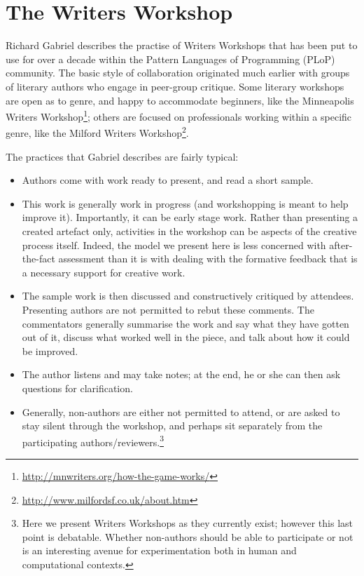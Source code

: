 \section{The Writers Workshop} \label{sec:writers-workshop}

Richard Gabriel \citeyear{gabriel2002writer} describes the practise of
Writers Workshops that has been put to use for over a decade within
the Pattern Languages of Programming (PLoP) community.  The basic
style of collaboration originated much earlier with groups of literary
authors who engage in peer-group critique.  Some literary workshops
are open as to genre, and happy to accommodate beginners, like the
Minneapolis Writers
Workshop\footnote{\url{http://mnwriters.org/how-the-game-works/}};
others are focused on professionals working within a specific genre,
like the Milford Writers
Workshop\footnote{\url{http://www.milfordsf.co.uk/about.htm}}.  

The
practices that Gabriel describes are fairly typical:  
\begin{itemize}
\item Authors come with work ready to present, and read a short
  sample.
\item This work is generally work in progress (and workshopping is
  meant to help improve it).  Importantly, it can be early stage work.
  Rather than presenting a created artefact only, activities in the
  workshop can be aspects of the creative process itself.  Indeed, the
  model we present here is less concerned with after-the-fact
  assessment than it is with dealing with the formative feedback that
  is a necessary support for creative work.
\item The sample work is then
discussed and constructively critiqued by attendees.  Presenting
authors are not permitted to rebut these comments.  The commentators
generally summarise the work and say what they have gotten out of it,
discuss what worked well in the piece, and talk about how it could be
improved.  
\item The author listens and may take notes; at the end, he or
she can then ask questions for clarification.  
\item Generally, non-authors
are either not permitted to attend, or are asked to stay silent
through the workshop, and perhaps sit separately from the
participating authors/reviewers.\footnote{Here we present Writers Workshops as they currently exist; however this last point is debatable. Whether non-authors should be able to participate or not is an interesting avenue for experimentation both in human and computational contexts.}
\end{itemize}

